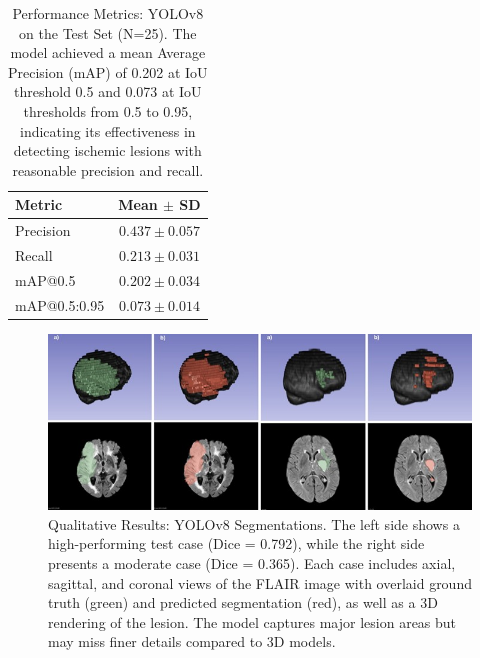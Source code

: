 \documentclass[12pt]{article}
\begin{document}
%
\begin{table}[tp]
\centering
\begin{tabular}{lc}
\toprule
Metric & Mean $\pm$ SD \\
\midrule
Precision & $0.437 \pm 0.057$ \\
Recall & $0.213 \pm 0.031$ \\
mAP@0.5 & $0.202 \pm 0.034$ \\
mAP@0.5:0.95 & $0.073 \pm 0.014$ \\
\bottomrule
\end{tabular}
\caption{Performance Metrics: YOLOv8 on the Test Set (N=25). The model achieved a mean Average Precision (mAP) of 0.202 at IoU threshold 0.5 and 0.073 at IoU thresholds from 0.5 to 0.95, indicating its effectiveness in detecting ischemic lesions with reasonable precision and recall.}\label{tab:yolov8_detection_metrics}
\end{table}

\begin{figure}[tp]
    \centering
    \includegraphics[width=\textwidth]{figures/Figure 6.jpg}
    \caption{Qualitative Results: YOLOv8 Segmentations. The left side shows a high-performing test case (Dice = 0.792), while the right side presents a moderate case (Dice = 0.365). Each case includes axial, sagittal, and coronal views of the FLAIR image with overlaid ground truth (green) and predicted segmentation (red), as well as a 3D rendering of the lesion. The model captures major lesion areas but may miss finer details compared to 3D models.}\label{fig:yolov8_qualitative}
\end{figure}


\end{document}
